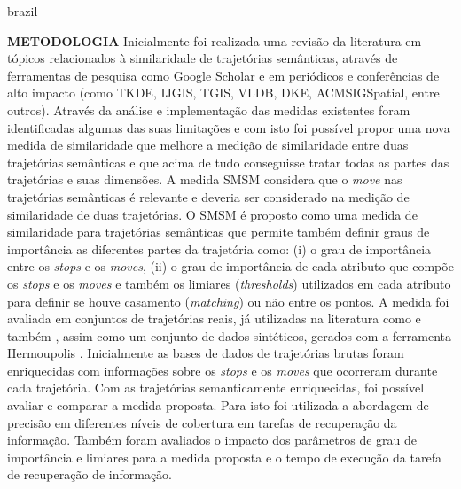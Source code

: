 {\begin{otherlanguage*}{brazil}
\begin{resumo}
        \textbf{METODOLOGIA}
        \newline
        \newline
        Inicialmente foi realizada uma revisão da literatura em tópicos relacionados à similaridade de trajetórias semânticas, através de ferramentas de pesquisa como Google Scholar e em periódicos e conferências de alto impacto (como TKDE, IJGIS, TGIS, VLDB, DKE, ACMSIGSpatial, entre outros). Através da análise e implementação das medidas existentes foram identificadas algumas das suas limitações e com isto foi possível propor uma nova medida de similaridade que melhore a medição de similaridade entre duas trajetórias semânticas {e que acima de tudo conseguisse tratar todas as partes das trajetórias e suas dimensões.}
        \newline
        A medida SMSM considera que o \emph{move} nas trajetórias semânticas é relevante e deveria ser considerado na medição de similaridade de duas trajetórias. O SMSM é proposto como uma medida de similaridade para trajetórias semânticas que permite {também definir graus de importância as diferentes partes da trajetória como:} (i) o grau de importância entre os \emph{stops} e os \emph{moves}, (ii) o grau de importância de cada atributo que compõe os \emph{stops} e os \emph{moves} e também os limiares (\emph{thresholds}) utilizados em cada atributo para definir se houve casamento (\emph{matching}) ou não entre os pontos.
        \newline
        A medida foi avaliada em conjuntos de trajetórias reais, já utilizadas na literatura como \cite{epfl-mobility-20090224} e também \cite{zheng2009mining}, assim como um conjunto de dados sintéticos, gerados com a ferramenta Hermoupolis \cite{Pelekis-Hermoupolis}. 
        Inicialmente as bases de dados de trajetórias brutas foram enriquecidas com informações sobre os \emph{stops} e os \emph{moves} que ocorreram durante cada trajetória. %
        Com as trajetórias semanticamente enriquecidas, foi possível avaliar e comparar a medida proposta. Para isto foi utilizada a abordagem de precisão em diferentes níveis de cobertura \cite{BaezaYatesRibeiroNeto2011} em tarefas de recuperação da informação. Também foram avaliados o impacto dos parâmetros de grau de importância e limiares para a medida proposta e o tempo de execução da tarefa de recuperação de informação.
        \newline
        \newline
        

\end{resumo}
\end{otherlanguage*}}
